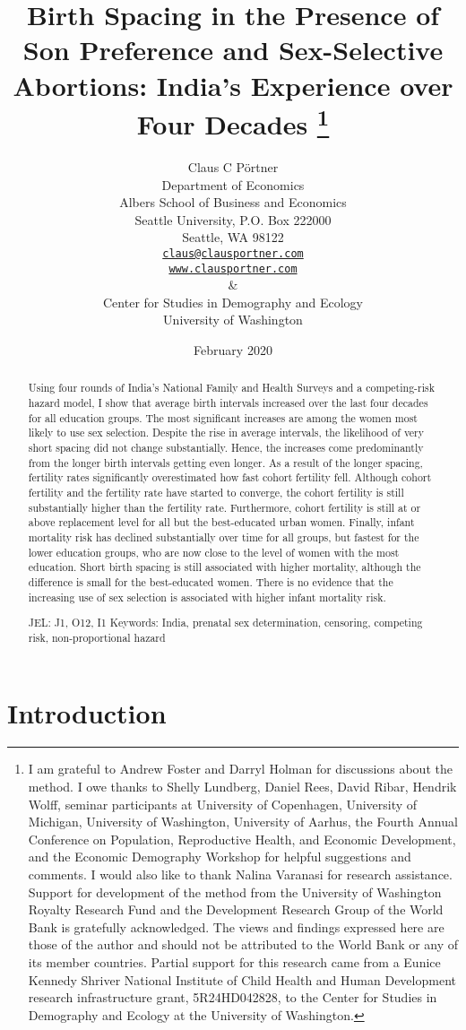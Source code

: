 \documentclass[12pt,letterpaper]{article}
\title{Birth Spacing in the Presence of Son Preference and Sex-Selective Abortions:
India's Experience over Four Decades%
\protect\thanks{%
I am grateful to Andrew Foster and Darryl Holman for discussions about the method.
I owe thanks to Shelly Lundberg, Daniel Rees, David Ribar, 
Hendrik Wolff, seminar participants at University of Copenhagen, University of Michigan, 
University of Washington, University of Aarhus, the Fourth 
Annual Conference on Population, Reproductive Health, 
and Economic Development, and the Economic Demography Workshop for helpful 
suggestions and comments.
I would also like to thank Nalina Varanasi for research assistance.
Support for development of the method from the University of Washington Royalty 
Research Fund and the Development Research Group of the World Bank is gratefully 
acknowledged.
The views and findings expressed here are those of the author and
should not be attributed to the World Bank or any of its member countries.
Partial support for this research came from a Eunice Kennedy Shriver National
Institute of Child Health and Human Development research infrastructure grant,
5R24HD042828, to the Center for Studies in Demography and Ecology at the
University of Washington.
}
}
\author{Claus C P\"ortner\\
    Department of Economics\\
    Albers School of Business and Economics\\
    Seattle University, P.O. Box 222000\\
    Seattle, WA 98122\\
    \href{mailto:claus@clausportner.com}{\texttt{claus@clausportner.com}}\\
    \href{http://www.clausportner.com}{\texttt{www.clausportner.com}}\\
    \& \\
    Center for Studies in Demography and Ecology \\
    University of Washington\\ \vspace{2cm}
    }
\date{February 2020}
\begin{document}
\graphicspath{{../figures/}}

\setcounter{page}{-1}
\maketitle
\thispagestyle{empty}



\newpage
\thispagestyle{empty}
\doublespacing

\begin{abstract}

\noindent 
Using four rounds of India's National Family and Health Surveys and a
competing-risk hazard model, I show that average birth intervals
increased over the last four decades for all education groups. The most
significant increases are among the women most likely to use sex
selection. Despite the rise in average intervals, the likelihood of very
short spacing did not change substantially. Hence, the increases come
predominantly from the longer birth intervals getting even longer. As a
result of the longer spacing, fertility rates significantly
overestimated how fast cohort fertility fell. Although cohort fertility
and the fertility rate have started to converge, the cohort fertility is
still substantially higher than the fertility rate. Furthermore, cohort
fertility is still at or above replacement level for all but the
best-educated urban women. Finally, infant mortality risk has declined
substantially over time for all groups, but fastest for the lower
education groups, who are now close to the level of women with the most
education. Short birth spacing is still associated with higher
mortality, although the difference is small for the best-educated women.
There is no evidence that the increasing use of sex selection is
associated with higher infant mortality risk.

\noindent JEL: J1, O12, I1
\noindent Keywords: India, prenatal sex determination, censoring, competing risk, non-proportional hazard
\end{abstract}

\newpage



\section{Introduction\label{sec:intro}}
\end{document}
